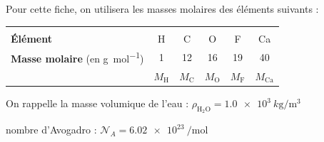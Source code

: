 \begin{prerequis}
Pour cette fiche, on utilisera les masses molaires des éléments suivants :
		\begin{center}
			\begin{tabular}{@{} |l|ccccc| @{}}
			\hline&&&&&\\[-3.5mm]
			\textbf{Élément}							&	H	&	C	&	O	&	 F	&	Ca	\\[1mm]
			\textbf{Masse molaire} (en \si{g.mol^{-1}})	& 1		&	12	&	16	&	19	&	40 \\ %
			 											& $M_\textrm{H}$	&	$M_\textrm{C}$	&	$M_\textrm{O}$	&	$M_\textrm{F}$	&	$M_\textrm{Ca}$ \\ \hline
			\end{tabular}		
		\end{center}
\minusSmallskip
On rappelle la masse volumique de l'eau : $\rho_{\textrm{H}_2\textrm{O}}=\SI{1,0e3}{k\gram\per\cubic\meter}$
	
\constantesUtiles
	\begin{listeConstantes}
		\item nombre d'Avogadro : $\mathcal{N}_A=\SI{6,02e23}{\per\mol}$
	\end{listeConstantes}
\end{prerequis}

\minusMedskip








